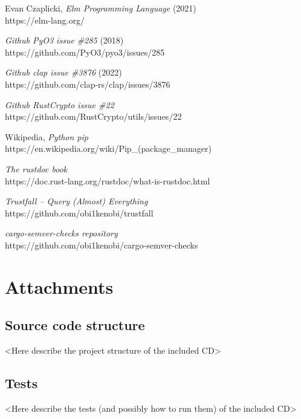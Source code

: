 \documentclass[licencjacka,en]{pracamgr}
\begin{document}
\begin{thebibliography}{99}
 Evan Czaplicki,
    \textit{Elm Programming Language} (2021) \\
    https://elm-lang.org/

    \textit{Github PyO3 issue \#285} (2018) \\
    https://github.com/PyO3/pyo3/issues/285

    \textit{Github clap issue \#3876} (2022) \\
    https://github.com/clap-rs/clap/issues/3876

    \textit{Github RustCrypto issue \#22} \\
    https://github.com/RustCrypto/utils/issues/22

 Wikipedia,
	\textit{Python pip} \\
	https://en.wikipedia.org/wiki/Pip\_(package\_manager)

	\textit{The rustdoc book} \\
	https://doc.rust-lang.org/rustdoc/what-is-rustdoc.html

	\textit{Trustfall -- Query (Almost) Everything} \\
	https://github.com/obi1kenobi/trustfall

	\textit{cargo-semver-checks repository} \\
	https://github.com/obi1kenobi/cargo-semver-checks

\end{thebibliography}



\chapter*{Attachments}\label{r:chapter_attachments}

\section*{Source code structure}

<Here describe the project structure of the included CD>


\section*{Tests}

<Here describe the tests (and possibly how to run them) of the included CD>
\end{document}
